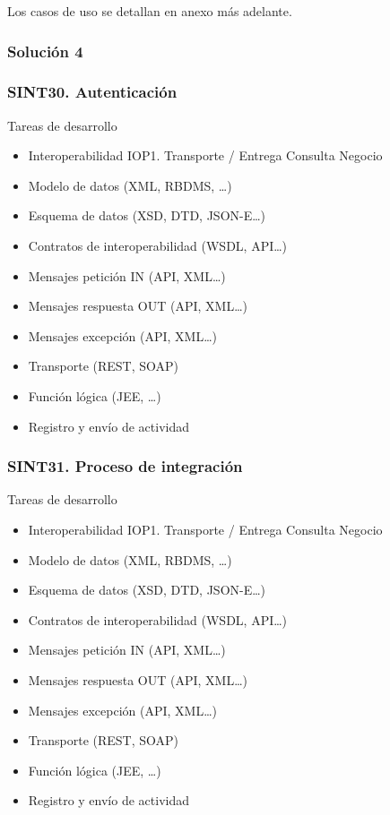 \documentclass[
  paper=a4,
  ,captions=tableheading
]{scrartcl}
\providecommand{\tightlist}{%
  \setlength{\itemsep}{0pt}\setlength{\parskip}{0pt}}
\begin{document}
Los casos de uso se detallan en anexo más adelante.

\subsubsection{Solución 4}\label{sec:soluciuxf3n-4}

\subsubsection{SINT30.
Autenticación}\label{sec:sint30.-autenticaciuxf3n}

Tareas de desarrollo

\begin{itemize}
\tightlist
\item
  Interoperabilidad IOP1. Transporte / Entrega Consulta Negocio\\
\item
  Modelo de datos (XML, RBDMS, \ldots)
\item
  Esquema de datos (XSD, DTD, JSON-E\ldots)
\item
  Contratos de interoperabilidad (WSDL, API\ldots)
\item
  Mensajes petición IN (API, XML\ldots)
\item
  Mensajes respuesta OUT (API, XML\ldots)
\item
  Mensajes excepción (API, XML\ldots)
\item
  Transporte (REST, SOAP)
\item
  Función lógica (JEE, \ldots)
\item
  Registro y envío de actividad
\end{itemize}

\subsubsection{SINT31. Proceso de
integración}\label{sec:sint31.-proceso-de-integraciuxf3n}

Tareas de desarrollo

\begin{itemize}
\tightlist
\item
  Interoperabilidad IOP1. Transporte / Entrega Consulta Negocio\\
\item
  Modelo de datos (XML, RBDMS, \ldots)
\item
  Esquema de datos (XSD, DTD, JSON-E\ldots)
\item
  Contratos de interoperabilidad (WSDL, API\ldots)
\item
  Mensajes petición IN (API, XML\ldots)
\item
  Mensajes respuesta OUT (API, XML\ldots)
\item
  Mensajes excepción (API, XML\ldots)
\item
  Transporte (REST, SOAP)
\item
  Función lógica (JEE, \ldots)
\item
  Registro y envío de actividad
\end{itemize}
\end{document}
